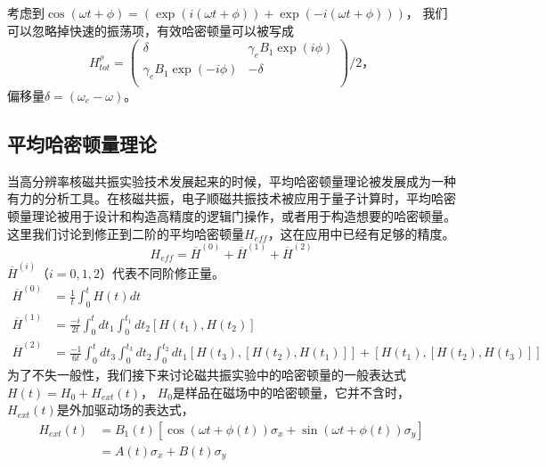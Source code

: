         考虑到$\cos(\omega t + \phi) = (\exp(i(\omega t + \phi))+\exp(-i(\omega t + \phi)))$， 我们可以忽略掉快速的振荡项，有效哈密顿量可以被写成
            \begin{equation}
            \label{H-rotation2}
            H_{tot}^{\rho} =  \left( \begin{array}{cc}
                               \delta  &  \gamma_e B_1 \exp(i\phi) \\
                                \gamma_e B_1\exp(-i\phi) & -\delta \\
                              \end{array}
                    \right)/2，
            \end{equation}
        偏移量$\delta = (\omega_e-\omega)$。

        \subsection{平均哈密顿量理论}
        当高分辨率核磁共振实验技术发展起来的时候，平均哈密顿量理论被发展成为一种有力的分析工具\cite{AHT}。在核磁共振，电子顺磁共振技术被应用于量子计算时，平均哈密顿量理论被用于设计和构造高精度的逻辑门操作\cite{GRAPE-ESR,GRAPE-NMR}，或者用于构造想要的哈密顿量。
        这里我们讨论到修正到二阶的平均哈密顿量$H_{eff}$，这在应用中已经有足够的精度。
            \begin{equation}
            H_{eff} = \overline{H}^{(0)} + \overline{H}^{(1)} + \overline{H}^{(2)}
            \end{equation}
            $\overline{H}^{(i)}$（$i=0,1,2$）代表不同阶修正量\cite{Schweiger_principles}。
            \begin{equation}
                \begin{split}
                   \overline{H}^{(0)}  &= \frac{1}{t}\int_0^t H(t)dt \\
                   \overline{H}^{(1)}  &= \frac{-i}{2t}\int_0^t dt_1 \int_0^{t_1} dt_2 [H(t_1),H(t_2)]\\
                   \overline{H}^{(2)}  &= \frac{-1}{6t}\int_0^t dt_3 \int_0^{t_3} dt_2 \int_0^{t_2} dt_1 {[H(t_3),[H(t_2),H(t_1)]]+[H(t_1),[H(t_2),H(t_3)]]}
                \end{split}
            \end{equation}
        为了不失一般性，我们接下来讨论磁共振实验中的哈密顿量的一般表达式$H(t) = H_0 + H_{ext}(t)$， $H_0$是样品在磁场中的哈密顿量，它并不含时，$H_{ext}(t)$是外加驱动场的表达式，
            \begin{equation}
                \begin{split}
                    H_{ext}(t)  & = B_1(t)[\cos(\omega t + \phi (t))\sigma_x + \sin(\omega t + \phi(t))\sigma_y] \\
                                & = A(t)\sigma_x + B(t)\sigma_y
                \end{split}
            \end{equation}
